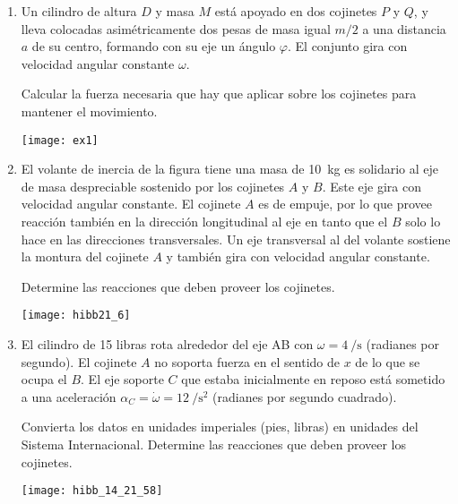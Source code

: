 \documentclass[11pt, spanish, a4paper, twoside]{article}
\begin{document}
\begin{enumerate}
\item 
\begin{minipage}[t][3.5cm]{0.6\textwidth}
Un cilindro de altura \(D\) y masa \(M\) está apoyado en dos cojinetes \(P\) y \(Q\), y lleva colocadas asimétricamente dos pesas de masa igual \(m/2\) a una distancia \(a\) de su centro, formando con su eje un ángulo \(\varphi\).
El conjunto gira con velocidad angular constante \(\omega\).
\begin{tasks} 
	\task Calcular la fuerza necesaria que hay que aplicar sobre los cojinetes para mantener el movimiento.
\end{tasks}
\end{minipage}
\begin{minipage}[c][0.5cm][t]{0.35\textwidth}
	\texttt{[image: ex1]}
\end{minipage}



\item 
\begin{minipage}[t][4.5cm]{0.65\textwidth}
El volante de inercia de la figura tiene una masa de \SI{10}{\kilo\gram} es solidario al eje de masa despreciable sostenido por los cojinetes \(A\) y \(B\).
Este eje gira con velocidad angular constante.
El cojinete \(A\) es de empuje, por lo que provee reacción también en la dirección longitudinal al eje en tanto que el \(B\) solo lo hace en las direcciones transversales.
Un eje transversal al del volante sostiene la montura del cojinete \(A\) y también gira con velocidad angular constante.
\begin{tasks} 
	\task Determine las reacciones que deben proveer los cojinetes.
\end{tasks}
\end{minipage}
\begin{minipage}[c][0.5cm][t]{0.3\textwidth}
	\texttt{[image: hibb21\_6]}
\end{minipage}



\item 
\begin{minipage}[t][3cm]{0.7\textwidth}
El cilindro de 15 libras rota alrededor del eje AB con \(\omega = \SI{4}{\per\second}\) (radianes por segundo).
El cojinete \(A\) no soporta fuerza en el sentido de \(x\) de lo que se ocupa el \(B\).
El eje soporte \(C\) que estaba inicialmente en reposo está sometido a una aceleración \(\alpha_C = \dot{\omega} = \SI{12}{\per\second\squared}\) (radianes por segundo cuadrado). 
\begin{tasks}
	\task Convierta los datos en unidades imperiales (pies, libras) en unidades del Sistema Internacional.
	\task Determine las reacciones que deben proveer los cojinetes.
\end{tasks}
\end{minipage}
\begin{minipage}[c][2cm][t]{0.25\textwidth}
	\texttt{[image: hibb\_14\_21\_58]}
\end{minipage}




\end{enumerate}
\end{document}
